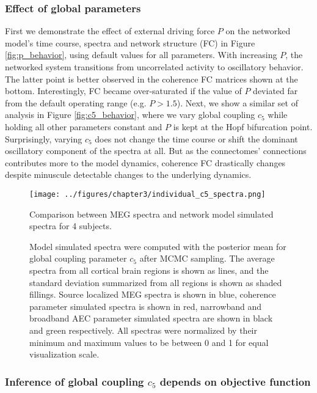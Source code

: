 \subsubsection{Effect of global parameters}
First we demonstrate the effect of external driving force $P$ on the networked model's time course, spectra and network structure (FC) in Figure \ref{fig:p_behavior}, using default values for all parameters. With increasing $P$, the networked system transitions from uncorrelated activity to oscillatory behavior. The latter point is better observed in the coherence FC matrices shown at the bottom. Interestingly, FC became over-saturated if the value of $P$ deviated far from the default operating range (e.g. $P>1.5$). Next, we show a similar set of analysis in Figure \ref{fig:c5_behavior}, where we vary global coupling $c_5$ while holding all other parameters constant and $P$ is kept at the Hopf bifurcation point. Surprisingly, varying $c_5$ does not change the time course or shift the dominant oscillatory component of the spectra at all. But as the connectomes' connections contributes more to the model dynamics, coherence FC drastically changes despite minuscule detectable changes to the underlying dynamics.

\begin{figure}[htbp]
    \centering
    \texttt{[image: ../figures/chapter3/individual\_c5\_spectra.png]}
    \caption{Comparison between MEG spectra and network model simulated spectra for 4 subjects.}
    \caption*{Model simulated spectra were computed with the posterior mean for global coupling parameter $c_5$ after MCMC sampling. The average spectra from all cortical brain regions is shown as lines, and the standard deviation summarized from all regions is shown as shaded fillings. Source localized MEG spectra is shown in blue, coherence parameter simulated spectra is shown in red, narrowband and broadband AEC parameter simulated spectra are shown in black and green respectively. All spectras were normalized by their minimum and maximum values to be between 0 and 1 for equal visualization scale.}
    \label{fig:c5_spectra}
\end{figure}

\subsubsection{Inference of global coupling $c_5$ depends on objective function}

